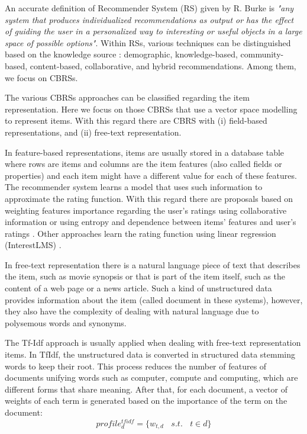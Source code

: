 \documentclass[preprint]{elsarticle}
\begin{document}
\begin{spacing}{1.5}
An accurate definition of Recommender System (RS) given by R. Burke \cite{Burke2002} is \emph{"any system that produces individualized recommendations as output or has the effect of guiding the user in a personalized way to interesting or useful objects in a large space of possible options"}. Within RSs, various techniques can be distinguished based on the knowledge source \cite{DePessemier2016}: demographic, knowledge-based, community-based, content-based, collaborative, and hybrid recommendations. Among them, we focus on CBRSs.

The various CBRSs approaches can be classified regarding the item representation. Here we focus on those CBRSs that use a vector space modelling to represent items. With this regard there are CBRS with (i) field-based representations, and (ii) free-text representation. 

In feature-based representations, items are usually stored in a database table where rows are items and columns are the item features (also called fields or properties) and each item might have a different value for each of these features. The recommender system learns a model that uses such information to approximate the rating function. With this regard there are proposals based on weighting features importance regarding the user's ratings using collaborative information \cite{Symeonidis2007} or using entropy and dependence between items' features and user's ratings \cite{Castro2014}. Other approaches learn the rating function using linear regression (InterestLMS) \cite{DePessemier2016}.

In free-text representation there is a natural language piece of text that describes the item, such as movie synopsis or that is part of the item itself, such as the content of a web page or a news article. Such a kind of unstructured data provides information about the item (called document in these systems), however, they also have the complexity of dealing with natural language due to polysemous words and synonyms. 

The Tf-Idf approach is usually applied when dealing with free-text representation items. In TfIdf, the unstructured data is converted in structured data stemming words \cite{Porter1980} to keep their root. This process reduces the number of features of documents unifying words such as computer, compute and computing, which are different forms that share meaning. After that, for each document, a vector of weights of each term is generated based on the importance of the term on the document:
\begin{equation}
	profile^{tfidf}_{d} = \{w_{t,d}~~~~s.t.~~~~ t \in d \}
	\label{eq:document-profile-tfidf}
\end{equation}


\end{spacing}
\end{document}
